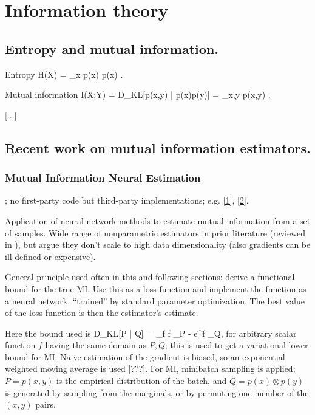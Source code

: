 \documentclass[notitlepage,openany,11pt]{report}
\numberwithin{equation}{section}
\theoremstyle{plain}%
\begin{document}
\section{Information theory}

\subsection{Entropy and mutual information.}

Entropy
\be
H(X) = \sum_{x} p(x) \log p(x) .
\ee

Mutual information
\be
I(X;Y) = D_{KL}[p(x,y) | p(x)p(y)] = \sum_{x,y} p(x,y) \log {}  .
\ee

[...]

\subsection{Recent work on mutual information estimators.}

\subsubsection{Mutual Information Neural Estimation}
\cite{BelghaziEtAl:18}; no first-party code but third-party implementations; e.g. \href{https://github.com/gtegner/mine-pytorch}{[1]}, \href{https://github.com/MasanoriYamada/Mine_pytorch}{[2]}.

Application of neural network methods to estimate mutual information from a set of samples. Wide range of nonparametric estimators in prior literature (reviewed in \cite{Paninski:03}), but argue they don't scale to high data dimensionality (also gradients can be ill-defined or expensive).

General principle used often in this and following sections: derive a functional bound for the true MI. Use this as a loss function and implement the function as a neural network, ``trained'' by standard parameter optimization. The best value of the loss function is then the estimator's estimate.

Here the bound used is
\be
D_{KL}[P | Q] = \sup_{f} \langle f \rangle_{P} - \log \langle e^f \rangle_{Q},
\ee
for arbitrary scalar function $f$ having the same domain as $P,Q$; this is used to get a variational lower bound for MI. Naive estimation of the gradient is biased, so an exponential weighted moving average is used [???]. For MI, minibatch sampling is applied; $P = p(x,y)$ is the empirical distribution of the batch, and $Q = p(x) \otimes p(y)$ is generated by sampling from the marginals, or by permuting one member of the $(x,y)$ pairs. 
\end{document}

